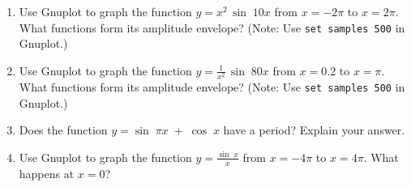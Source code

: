 {\begin{enumerate}[\bfseries 1.]
  You can think of this function as $\sin\;12x$ with a sinusoidally varying ``amplitude''of
  $0.5\,\sin\;x$. What is the period of this function?
  From the graph it looks like the amplitude may be $0.5$.
  Without finding the exact amplitude, explain why the amplitude is in fact \emph{less} than $0.5$.
  The function above is known as a \emph{modulated wave}, and the functions
  $\pm\,0.5\,\sin\;x$ form an \emph{amplitude envelope} for the wave (i.e.
  they enclose the wave). Use an identity from Section 3.4 to write this function as a sum of
  sinusoidal curves.
 \item Use Gnuplot to graph the function $y= x^2 \,\sin\;10x$ from $x = -2\pi$ to $x=2\pi$. What
  functions form its amplitude envelope? (Note: Use \texttt{set samples 500} in Gnuplot.)
 \item Use Gnuplot to graph the function $y= \frac{1}{x^2} \,\sin\;80x$ from $x = 0.2$ to $x=\pi$.
  What functions form its amplitude envelope? (Note: Use \texttt{set samples 500} in Gnuplot.)
 \item Does the function $y=\sin\;\pi x \;+\; \cos\;x$ have a period? Explain your answer.
 \item Use Gnuplot to graph the function $y=\frac{\sin\;x}{x}$ from $x=-4\pi$ to $x=4\pi$. What
  happens at $x=0$?
\end{enumerate}}





